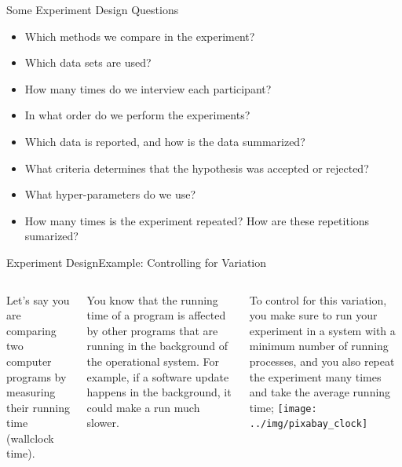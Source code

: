 \begin{frame}{Some Experiment Design Questions}
  \begin{itemize}
    \item Which methods we compare in the experiment?
    \item Which data sets are used?
    \item How many times do we interview each participant?
    \item In what order do we perform the experiments?
    \item Which data is reported, and how is the data summarized?
    \item What criteria determines that the hypothesis was accepted or rejected?
    \item What hyper-parameters do we use?
    \item How many times is the experiment repeated? How are these repetitions sumarized?
  \end{itemize}
\end{frame}


\begin{frame}{Experiment Design}{Example: Controlling for Variation}
  \begin{columns}
    Let's say you are comparing two computer programs by measuring their running time (wallclock time).
    \bigskip

    You know that the running time of a program is affected by other programs that are running in the background of the operational system. For example, if a software update happens in the background, it could make a run much slower.
    \bigskip

    To control for this variation, you make sure to run your experiment in a system with a minimum number of running processes, and you also repeat the experiment many times and take the average running time;
    \texttt{[image: ../img/pixabay\_clock]}
  \end{columns}
\end{frame}

